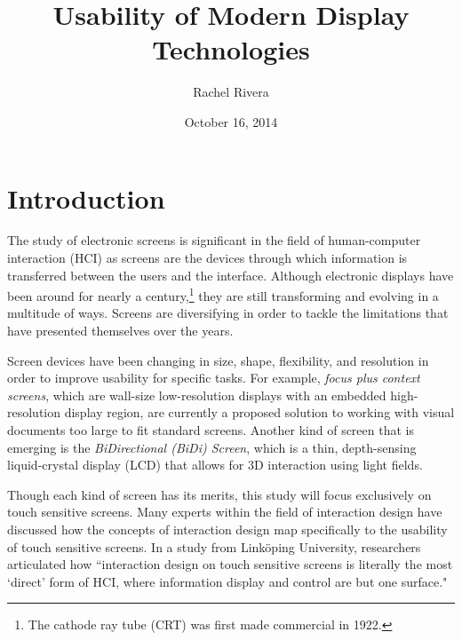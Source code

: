 \documentclass{article}
\title{Usability of Modern Display Technologies}
\author{Rachel Rivera}
\date{October 16, 2014}
\begin{document}
\maketitle


\pagebreak
\tableofcontents


\pagebreak

%
%
\section{Introduction}
\label{introduction}

The study of electronic screens is significant in the field of human-computer interaction (HCI) as screens are the devices through which information is transferred between the users and the interface. Although electronic displays have been around for nearly a century,\footnote{The cathode ray tube (CRT) was first made commercial in 1922.\cite{Cathode}} they are still transforming and evolving in a multitude of ways. Screens are diversifying in order to tackle the limitations that have presented themselves over the years. 

Screen devices have been changing in size, shape, flexibility, and resolution in order to improve usability for specific tasks. For example, \textit{focus plus context screens}, which are wall-size low-resolution displays with an embedded high-resolution display region, are currently a proposed solution to working with visual documents too large to fit standard screens.\cite{Baudisch} Another kind of screen that is emerging is the \textit{BiDirectional (BiDi) Screen}, which is a thin, depth-sensing liquid-crystal display (LCD) that allows for 3D interaction using light fields.\cite{Hirsch}

 Though each kind of screen has its merits, this study will focus exclusively on touch sensitive screens. Many experts within the field of interaction design have discussed how the concepts of interaction design map specifically to the usability of touch sensitive screens. In a study from Link\"{o}ping University, researchers articulated how ``interaction design on touch sensitive screens is literally the most `direct' form of HCI, where information display and control are but one surface."\cite{Albinsson}
\end{document}
